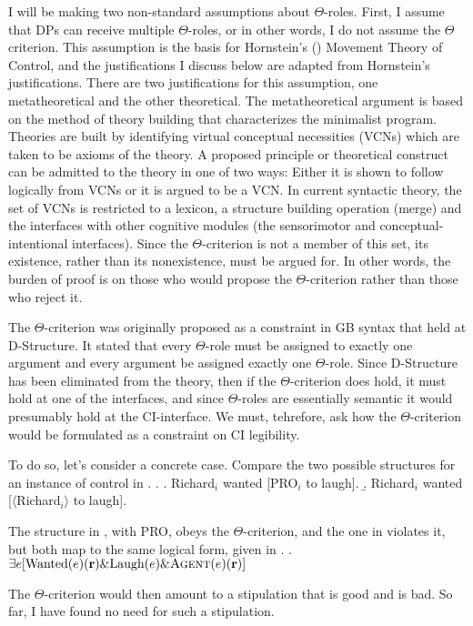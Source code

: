 \documentclass[letterpaper,12pt]{article}
\begin{document}
I will be making two non-standard assumptions about $\Theta$-roles.
First, I assume that DPs can receive multiple $\Theta$-roles, or in other words, I do not assume the $\Theta$ criterion.
This assumption is the basis for Hornstein's (\citeyear{hornstein1999movement,hornstein2009theory}) Movement Theory of Control, and the justifications I discuss below are adapted from Hornstein's justifications.
There are two justifications for this assumption, one metatheoretical and the other theoretical.
The metatheoretical argument is based on the method of theory building that characterizes the minimalist program.
Theories are built by identifying virtual conceptual necessities (VCNs) which are taken to be axioms of the theory.
A proposed principle or theoretical construct can be admitted to the theory in one of two ways:
Either it is shown to follow logically from VCNs or it is argued to be a VCN.
In current syntactic theory, the set of VCNs is restricted to a lexicon, a structure building operation (merge) and the interfaces with other cognitive modules (the sensorimotor and conceptual-intentional interfaces).
Since the $\Theta$-criterion is not a member of this set, its existence, rather than its nonexistence, must be argued for.
In other words, the burden of proof is on those who would propose the $\Theta$-criterion rather than those who reject it.

The $\Theta$-criterion was originally proposed as a constraint in GB syntax that held at D-Structure. 
It stated that every $\Theta$-role must be assigned to exactly one argument and every argument be assigned exactly one $\Theta$-role.
Since D-Structure has been eliminated from the theory, then if the $\Theta$-criterion does hold, it must hold at one of the interfaces, and since $\Theta$-roles are essentially semantic it would presumably hold at the CI-interface.
We must, tehrefore, ask how the $\Theta$-criterion would be formulated as a constraint on CI legibility.

To do so, let's consider a concrete case.
Compare the two possible structures for an instance of control in \Next.
\ex.
\a. Richard$_i$ wanted [PRO$_i$ to laugh].
\b. Richard$_i$ wanted [$\langle$Richard$_i\rangle$ to laugh].

The structure in \Last[a], with PRO, obeys the $\Theta$-criterion, and the one in \Last[b] violates it, but both map to the same logical form, given in \Next.
\ex. $\exists e [\text{Wanted}(e)(\textbf{r}) \& \text{Laugh}(e) \& \textsc{Agent}(e)(\textbf{r})]$

The $\Theta$-criterion would then amount to a stipulation that \LLast[a] is good and \LLast[b] is bad.
So far, I have found no need for such a stipulation.
\end{document}

